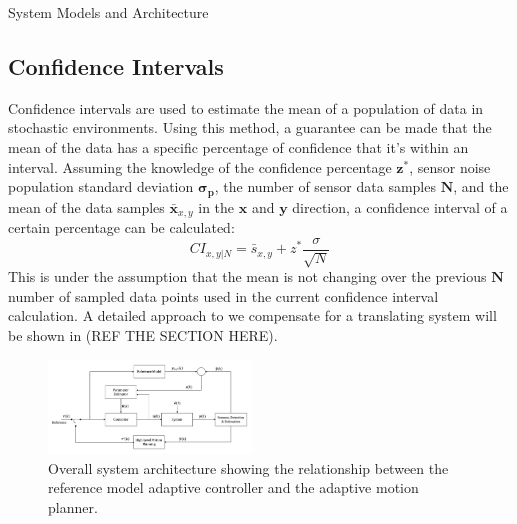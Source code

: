 \begin{section}{System Models and Architecture}
 \subsection{Confidence Intervals}

Confidence intervals are used to estimate the mean of a population of data in stochastic environments. Using this method, a guarantee can be made that the mean of the data has a specific percentage of confidence that it's within an interval. Assuming the knowledge of the confidence percentage $ \bm{z^{*}} $, sensor noise population standard deviation $ \bm{\sigma_p} $, the number of sensor data samples $ \bm{N} $, and the mean of the data samples $ \bm{\bar{x}}_{x,y} $ in the $\bm{x}$ and $\bm{y}$ direction, a confidence interval of a certain percentage can be calculated: 
 	\begin{equation}
		CI_{x,y|N} = \bar{s}_{x,y} + z^{*}\frac{\sigma}{\sqrt{N}}
	\end{equation}
This is under the assumption that the mean is not changing over the previous $\bm{N}$ number of sampled data points used in the current confidence interval calculation. A detailed approach to we compensate for a translating system will be shown in (REF THE SECTION HERE).



\begin{figure}
\vspace{1pt}
\centering
\includegraphics[width=0.48\textwidth]{sys_arch.png}
\caption{Overall system architecture showing the relationship between the reference model adaptive controller and the adaptive motion planner.}
\label{fig:system_arch}
\end{figure}



\end{section}